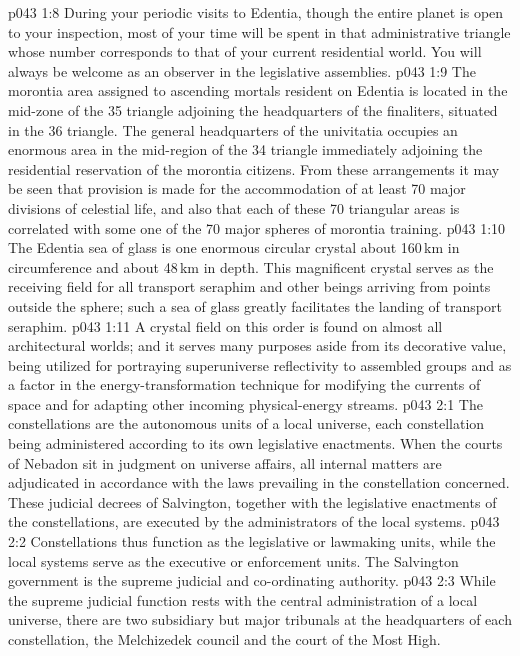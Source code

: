 \vs p043 1:8 During your periodic visits to Edentia, though the entire planet is open to your inspection, most of your time will be spent in that administrative triangle whose number corresponds to that of your current residential world. You will always be welcome as an observer in the legislative assemblies.
\vs p043 1:9 The morontia area assigned to ascending mortals resident on Edentia is located in the mid\hyp{}zone of the 35 triangle adjoining the headquarters of the finaliters, situated in the 36 triangle. The general headquarters of the univitatia occupies an enormous area in the mid\hyp{}region of the 34 triangle immediately adjoining the residential reservation of the morontia citizens. From these arrangements it may be seen that provision is made for the accommodation of at least 70 major divisions of celestial life, and also that each of these 70 triangular areas is correlated with some one of the 70 major spheres of morontia training.
\vs p043 1:10 The Edentia sea of glass is one enormous circular crystal about 160\,km in circumference and about 48\,km in depth. This magnificent crystal serves as the receiving field for all transport seraphim and other beings arriving from points outside the sphere; such a sea of glass greatly facilitates the landing of transport seraphim.
\vs p043 1:11 A crystal field on this order is found on almost all architectural worlds; and it serves many purposes aside from its decorative value, being utilized for portraying superuniverse reflectivity to assembled groups and as a factor in the energy\hyp{}transformation technique for modifying the currents of space and for adapting other incoming physical\hyp{}energy streams.
\vs p043 2:1 The constellations are the autonomous units of a local universe, each constellation being administered according to its own legislative enactments. When the courts of Nebadon sit in judgment on universe affairs, all internal matters are adjudicated in accordance with the laws prevailing in the constellation concerned. These judicial decrees of Salvington, together with the legislative enactments of the constellations, are executed by the administrators of the local systems.
\vs p043 2:2 Constellations thus function as the legislative or lawmaking units, while the local systems serve as the executive or enforcement units. The Salvington government is the supreme judicial and co\hyp{}ordinating authority.
\vs p043 2:3 \pc While the supreme judicial function rests with the central administration of a local universe, there are two subsidiary but major tribunals at the headquarters of each constellation, the Melchizedek council and the court of the Most High.
